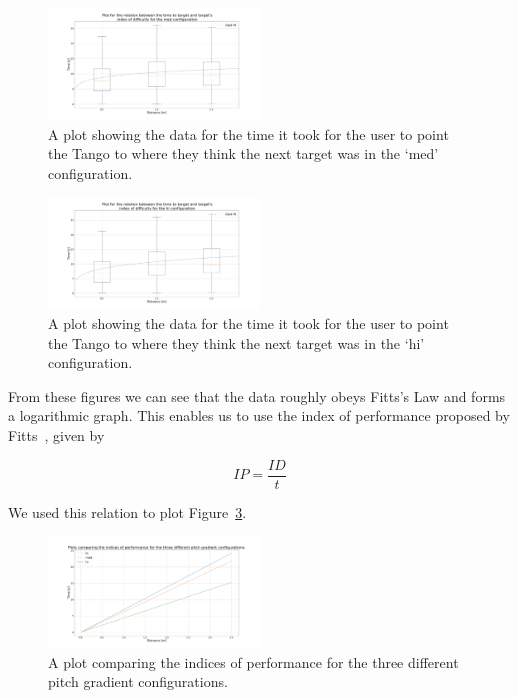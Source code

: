 \documentclass[format=sigconf, review=true, screen=true, anonymous=true]{acmart}
\begin{document}
\begin{figure}
  \centering
  \includegraphics[width=0.5\textwidth]{figures/fitts_med.png}
  \caption{A plot showing the data for the time it took for the user to point the Tango to where they think the next target was in the `med' configuration. }
  \label{fig:fitts-med}
\end{figure}

\begin{figure}
  \centering
  \includegraphics[width=0.5\textwidth]{figures/fitts_hi.png}
  \caption{A plot showing the data for the time it took for the user to point the Tango to where they think the next target was in the `hi' configuration. }
  \label{fig:fitts-hi}
\end{figure}

From these figures we can see that the data roughly obeys Fitts's Law and forms a logarithmic graph. This enables us to use the index of performance proposed by Fitts~\cite[p.~390]{fitts1954information}, given by

\[
  IP = \frac{ID}{t}
\]

We used this relation to plot Figure~\ref{fig:fitts-performance}.

\begin{figure}
  \centering
  \includegraphics[width=0.5\textwidth]{figures/fitts_performance.png}
  \caption{A plot comparing the indices of performance for the three different pitch gradient configurations.}
  \label{fig:fitts-performance}
\end{figure}
\end{document}
